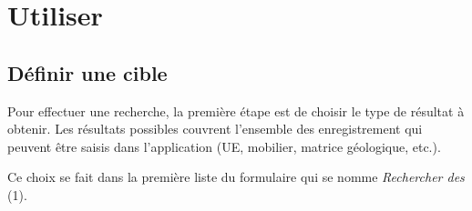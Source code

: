 \documentclass[letterpaper,10pt,french]{sphinxmanual}
\begin{document}
\section{Utiliser}
\label{manuel/formulaire_recherche:utiliser}\begin{figure}[htbp]
\centering

\end{figure}


\subsection{Définir une cible}
\label{manuel/formulaire_recherche:definir-une-cible}
Pour effectuer une recherche, la première étape est de choisir le type de résultat à obtenir. Les résultats possibles couvrent l'ensemble des enregistrement qui peuvent être saisis dans l'application (UE, mobilier, matrice géologique, etc.).

Ce choix se fait dans la première liste du formulaire qui se nomme \emph{Rechercher des} (1).
\begin{figure}[htbp]
\centering

\end{figure}
\end{document}
